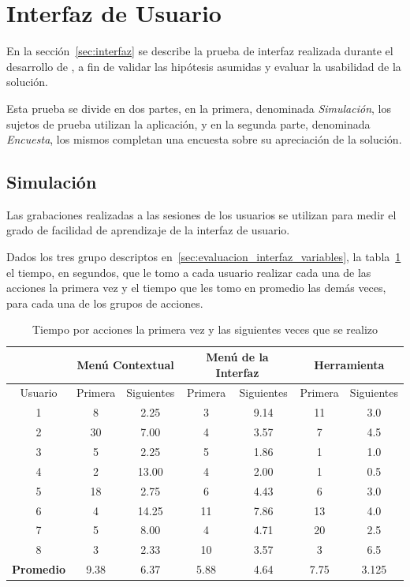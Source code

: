 \section{Interfaz de Usuario}
\label{sec:res_interfaz}

En la sección~\ref{sec:interfaz} se describe la prueba de interfaz realizada
durante el desarrollo de , a fin de validar las
hipótesis asumidas y evaluar la usabilidad de la solución.

Esta prueba se divide en dos partes, en la primera, denominada
\emph{Simulación}, los sujetos de prueba utilizan la aplicación, y en la
segunda parte, denominada \emph{Encuesta}, los mismos completan una encuesta
sobre su apreciación de la solución.

\subsection{Simulación}

Las grabaciones realizadas a las sesiones de los usuarios se utilizan para medir
el grado de facilidad de aprendizaje de la interfaz de usuario.

Dados los tres grupo descriptos en~\ref{sec:evaluacion_interfaz_variables}, la
tabla~\ref{tab:interfaz_tiempo_acciones}  el tiempo, en segundos,
que le tomo a cada usuario realizar cada una de las acciones la primera vez y
el tiempo que les tomo en promedio las demás veces, para cada una de los grupos
de acciones.


\begin{table}[!hbt]
\centering
\begin{tabular}{|c|c|c|c|c|c|c|}
\hline
\rowcolor{gris} \textbf{} & \multicolumn{2}{|c|}{\textbf{Menú Contextual}} &
\multicolumn{2}{|c|}{\textbf{Menú de la Interfaz}} &
\multicolumn{2}{|c|}{\textbf{Herramienta}}\\
\hline
\rowcolor{gris} Usuario & Primera & Siguientes & Primera & Siguientes & Primera & Siguientes \\
\hline 1 &  8 &  2.25 &  3 & 9.14 & 11 & 3.0 \\
\hline 2 & 30 &  7.00 &  4 & 3.57 &  7 & 4.5 \\
\hline 3 &  5 &  2.25 &  5 & 1.86 &  1 & 1.0 \\
\hline 4 &  2 & 13.00 &  4 & 2.00 &  1 & 0.5 \\
\hline 5 & 18 &  2.75 &  6 & 4.43 &  6 & 3.0 \\
\hline 6 &  4 & 14.25 & 11 & 7.86 & 13 & 4.0 \\
\hline 7 &  5 &  8.00 &  4 & 4.71 & 20 & 2.5 \\
\hline 8 &  3 &  2.33 & 10 & 3.57 &  3 & 6.5 \\
\hline
\textbf{Promedio} & 9.38 & 6.37 & 5.88 & 4.64 & 7.75 & 3.125 \\
\end{tabular}
\caption{Tiempo por acciones la primera vez y las siguientes veces que se realizo}
\label{tab:interfaz_tiempo_acciones}
\end{table}

